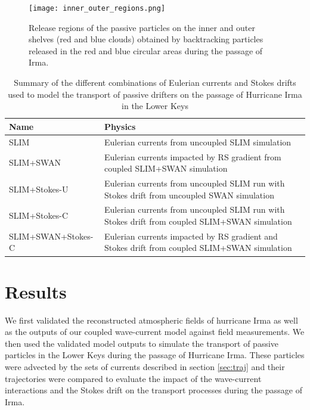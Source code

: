 \documentclass[preprint,12pt,authoryear]{elsarticle}
\begin{document}
\begin{figure}
    \centering
    \texttt{[image: inner\_outer\_regions.png]}
    \caption{Release regions of the passive particles on the inner and outer shelves (red and blue clouds) obtained by backtracking particles released in the red and blue circular areas during the passage of Irma.}
    \label{fig:init}
\end{figure}

\begin{table}
    \centering
    \begin{tabular}{|p{4.5cm}|p{8cm}|}
        \hline
        \textbf{Name} & \textbf{Physics} \\ \hline
        SLIM               & Eulerian currents from uncoupled SLIM simulation \\ \hline
        SLIM+SWAN          & Eulerian currents impacted by RS gradient from coupled SLIM+SWAN simulation \\ \hline
        SLIM+Stokes-U      & Eulerian currents from uncoupled SLIM run with Stokes drift from uncoupled SWAN simulation \\ \hline
        SLIM+Stokes-C      & Eulerian currents from uncoupled SLIM run with Stokes drift from coupled SLIM+SWAN simulation \\ \hline
        SLIM+SWAN+Stokes-C & Eulerian currents impacted by RS gradient and Stokes drift from coupled SLIM+SWAN simulation \\ \hline
    \end{tabular}
    \caption{Summary of the different combinations of Eulerian currents and Stokes drifts used to model the transport of passive drifters on the passage of Hurricane Irma in the Lower Keys}
    \label{tab:summary}
\end{table}

\section{Results}

We first validated the reconstructed atmospheric fields of hurricane Irma as well as the outputs of our coupled wave-current model against field measurements. We then used the validated model outputs to simulate the transport of passive particles in the Lower Keys during the passage of Hurricane Irma. These particles were advected by the sets of currents described in section \ref{sec:traj} and their trajectories were compared to evaluate the impact of the wave-current interactions and the Stokes drift on the transport processes during the passage of Irma.
\end{document}
